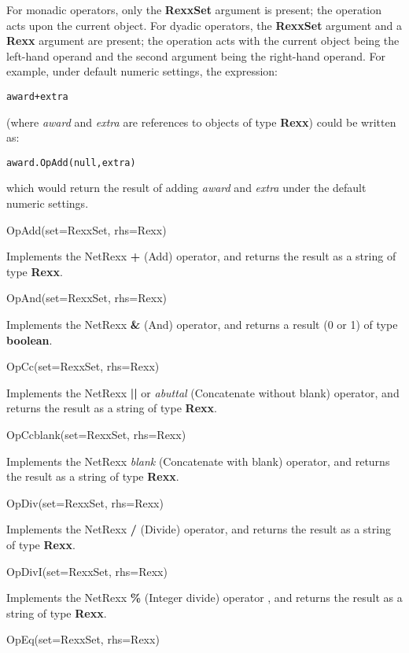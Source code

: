 For monadic operators, only the \textbf{RexxSet} argument is present;
the operation acts upon the current object.
For dyadic operators, the \textbf{RexxSet} argument and
a \textbf{Rexx} argument are present; the operation acts with the
current object being the left-hand operand and the second argument being
the right-hand operand.  For example, under default numeric settings,
the expression:
\begin{alltt}
award+extra
\end{alltt}
(where \emph{award} and \emph{extra} are references to objects
of type \textbf{Rexx}) could be written as:
\begin{alltt}
award.OpAdd(null, extra)
\end{alltt}
which would return the result of adding \emph{award} and
\emph{extra} under the default numeric settings.
\begin{description}
\item{OpAdd(set=RexxSet, rhs=Rexx)}

Implements the NetRexx \textbf{\textbf{+}} (Add) operator,
and returns the result as a string of type \textbf{Rexx}.
\item{OpAnd(set=RexxSet, rhs=Rexx)}

Implements the NetRexx \textbf{\textbf{\&}} (And)
operator,
and returns a result (0 or 1) of type \textbf{boolean}.
\item{OpCc(set=RexxSet, rhs=Rexx)}

Implements the NetRexx \textbf{\textbf{||}} or
\emph{abuttal} (Concatenate without blank) operator, and
returns the result as a string of type \textbf{Rexx}.
\item{OpCcblank(set=RexxSet, rhs=Rexx)}

Implements the NetRexx \emph{blank} (Concatenate with blank)
operator, and returns the result as a string of type \textbf{Rexx}.
\item{OpDiv(set=RexxSet, rhs=Rexx)}

Implements the NetRexx \textbf{\textbf{/}} (Divide) operator,
and returns the result as a string of type \textbf{Rexx}.
\item{OpDivI(set=RexxSet, rhs=Rexx)}

Implements the NetRexx \textbf{\textbf{\%}} (Integer divide) operator
, and returns the result as a string of type \textbf{Rexx}.
\item{OpEq(set=RexxSet, rhs=Rexx)}


\end{description}
